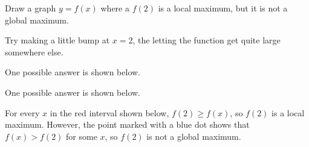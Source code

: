 \begin{question}
Draw a graph $y=f(x)$ where a $f(2)$ is a local maximum, but it is not a  global maximum.
\end{question}
\begin{hint}
Try making a little bump at $x=2$, the letting the function get quite large somewhere else.
\end{hint}
\begin{answer}
One possible answer is shown below.
\begin{center}
\end{center}
\end{answer}
\begin{solution}
One possible answer is shown below.
\begin{center}
\end{center}
For every $x$ in the red interval shown below, $f(2) \geq f(x)$, so $f(2)$ is a local maximum. However, the point marked with a blue dot shows that $f(x)>f(2)$ for some $x$, so $f(2)$ is not a global maximum.
\begin{center}
\end{center}
\end{solution}

\subsection*{\Procedural}


